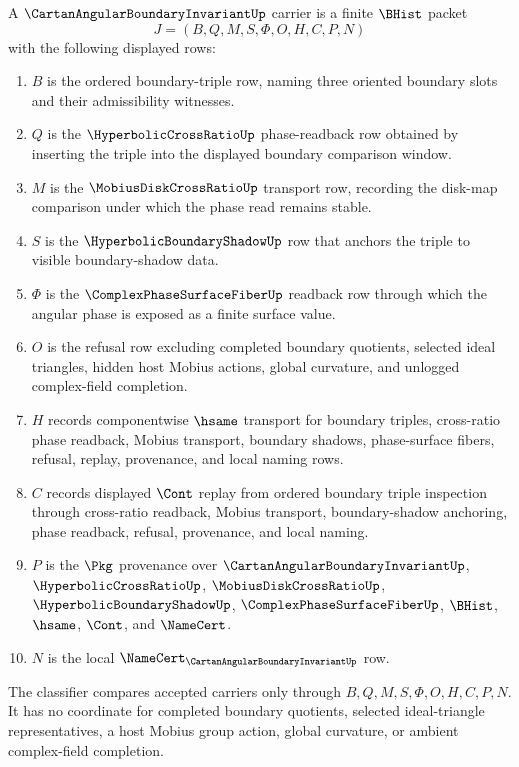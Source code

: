 \begin{definition}
\label{def:cartan-angular-boundary-invariant-carrier}
A $\CartanAngularBoundaryInvariantUp$ carrier is a finite $\BHist$ packet
$$
J=(B,Q,M,S,\Phi,O,H,C,P,N)
$$
with the following displayed rows:
\begin{enumerate}
\item $B$ is the ordered boundary-triple row, naming three oriented boundary slots and their admissibility witnesses.
\item $Q$ is the $\HyperbolicCrossRatioUp$ phase-readback row obtained by inserting the triple into the displayed boundary comparison window.
\item $M$ is the $\MobiusDiskCrossRatioUp$ transport row, recording the disk-map comparison under which the phase read remains stable.
\item $S$ is the $\HyperbolicBoundaryShadowUp$ row that anchors the triple to visible boundary-shadow data.
\item $\Phi$ is the $\ComplexPhaseSurfaceFiberUp$ readback row through which the angular phase is exposed as a finite surface value.
\item $O$ is the refusal row excluding completed boundary quotients, selected ideal triangles, hidden host Mobius actions, global curvature, and unlogged complex-field completion.
\item $H$ records componentwise $\hsame$ transport for boundary triples, cross-ratio phase readback, Mobius transport, boundary shadows, phase-surface fibers, refusal, replay, provenance, and local naming rows.
\item $C$ records displayed $\Cont$ replay from ordered boundary triple inspection through cross-ratio readback, Mobius transport, boundary-shadow anchoring, phase readback, refusal, provenance, and local naming.
\item $P$ is the $\Pkg$ provenance over $\CartanAngularBoundaryInvariantUp$, $\HyperbolicCrossRatioUp$, $\MobiusDiskCrossRatioUp$, $\HyperbolicBoundaryShadowUp$, $\ComplexPhaseSurfaceFiberUp$, $\BHist$, $\hsame$, $\Cont$, and $\NameCert$.
\item $N$ is the local $\NameCert_{\CartanAngularBoundaryInvariantUp}$ row.
\end{enumerate}
The classifier compares accepted carriers only through $B,Q,M,S,\Phi,O,H,C,P,N$. It has no coordinate for completed boundary quotients, selected ideal-triangle representatives, a host Mobius group action, global curvature, or ambient complex-field completion.
\end{definition}

